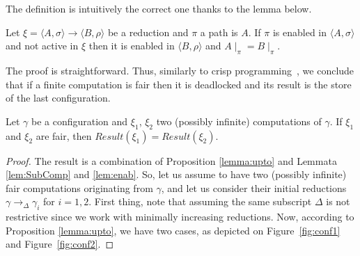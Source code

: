 \documentclass{llncs}
\begin{document}
The definition is intuitively the correct one thanks to the lemma below.

\begin{lemma}
\label{lem:enab}
Let $\xi = \langle A, \sigma \rangle \rightarrow \langle B, \rho \rangle$ be a reduction
and $\pi$ a path is $A$. 
If $\pi$ is enabled in $\langle A, \sigma \rangle$ and not active in $\xi$ then it is enabled in 
$\langle B, \rho \rangle$ and $A\mid_{\pi} = B\mid_{\pi}$.
\end{lemma}

The proof is straightforward. Thus, 
similarly to crisp programming~\cite{popl91}, we conclude that 
if a finite computation is fair
then it is deadlocked and its result is the store of the last configuration.

\begin{theorem}[Confluence]\label{prop:confluence}
Let $\gamma$ be a configuration and $\xi_1$, $\xi_2$ two (possibly infinite)
computations of $\gamma$.
%
If $\xi_1$ and $\xi_2$ are fair, then $\mathit{Result}(\xi_1) = \mathit{Result}(\xi_2)$.
\end{theorem}

\begin{proof}
The result is a combination of Proposition \ref{lemma:upto} and Lemmata \ref{lem:SubComp}
and \ref{lem:enab}. So, let us assume to have two (possibly infinite) fair computations originating from $\gamma$, and let us consider their initial reductions $\gamma \rightarrow_\Delta \gamma_i$ 
for $i =  1, 2$. 
First thing, note that assuming the same subscript $\Delta$ is not restrictive since we work with minimally increasing reductions.
%
Now, according to Proposition \ref{lemma:upto}, we have two cases, as depicted on Figure~\ref{fig:conf1} and Figure~\ref{fig:conf2}.
\end{proof}

%					
	
\end{document}
